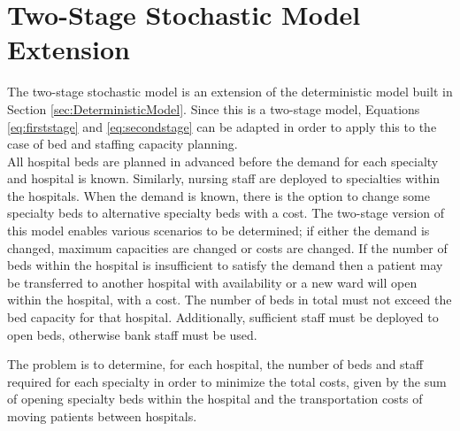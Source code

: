 \documentclass[../thesis.tex]{subfiles}
\begin{document}
{%




\section{Two-Stage Stochastic Model Extension}\label{sec:twostagestochasticmodel}
The two-stage stochastic model is an extension of the deterministic model built in Section \ref{sec:DeterministicModel}. Since this is a two-stage model, Equations \eqref{eq:firststage} and \eqref{eq:secondstage} can be adapted in order to apply this to the case of bed and staffing capacity planning. \\\newline
All hospital beds are planned in advanced before the demand for each specialty and hospital is known. Similarly, nursing staff are deployed to specialties within the hospitals. When the demand is known, there is the option to change some specialty beds to alternative specialty beds with a cost. The two-stage version of this model enables various scenarios to be determined; if either the demand is changed, maximum capacities are changed or costs are changed. If the number of beds within the hospital is insufficient to satisfy the demand then a patient may be transferred to another hospital with availability or a new ward will open within the hospital, with a cost. The number of beds in total must not exceed the bed capacity for that hospital. Additionally, sufficient staff must be deployed to open beds, otherwise bank staff must be used.

The problem is to determine, for each hospital, the number of beds and staff required for each specialty in order to minimize the total costs, given by the sum of opening specialty beds within the hospital and the transportation costs of moving patients between hospitals. %


}
\end{document}

